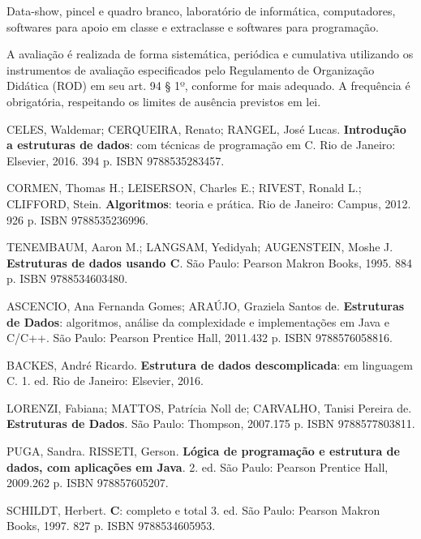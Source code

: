 \begin{pud}
	\recursos
	Data-show, pincel e quadro branco, laboratório de informática, computadores,
softwares para apoio em classe e extraclasse e softwares para programação.

	\avaliacao
	A avaliação é realizada de forma sistemática, periódica e cumulativa utilizando os
instrumentos de avaliação especificados pelo Regulamento de Organização
Didática (ROD) em seu art. 94 § 1º, conforme for mais adequado. A frequência é
obrigatória, respeitando os limites de ausência previstos em lei.
	\naopresencial
	
	
	\begin{bibbasica}
		\item CELES, Waldemar; CERQUEIRA, Renato; RANGEL, José Lucas. \textbf{Introdução a
estruturas de dados}: com técnicas de programação em C. Rio de Janeiro:
Elsevier, 2016. 394 p. ISBN 9788535283457.
		\item CORMEN, Thomas H.; LEISERSON, Charles E.; RIVEST, Ronald L.; CLIFFORD,
Stein. \textbf{Algoritmos}: teoria e prática. Rio de Janeiro: Campus, 2012. 926 p. ISBN
9788535236996.
		\item TENEMBAUM, Aaron M.; LANGSAM, Yedidyah; AUGENSTEIN, Moshe J.
\textbf{Estruturas de dados usando C}. São Paulo: Pearson Makron Books, 1995. 884 p.
ISBN 9788534603480.
	\end{bibbasica}
	
	
	\begin{bibcomplementar}
		\item ASCENCIO, Ana Fernanda Gomes; ARAÚJO, Graziela Santos de. \textbf{Estruturas de
Dados}: algoritmos, análise da complexidade e implementações em Java e C/C++.
São Paulo: Pearson Prentice Hall, 2011.432 p. ISBN 9788576058816.
		\item BACKES, André Ricardo. \textbf{Estrutura de dados descomplicada}: em linguagem C.
1. ed. Rio de Janeiro: Elsevier, 2016.
		\item LORENZI, Fabiana; MATTOS, Patrícia Noll de; CARVALHO, Tanisi Pereira de.
\textbf{Estruturas de Dados}. São Paulo: Thompson, 2007.175 p. ISBN 9788577803811.
		\item PUGA, Sandra. RISSETI, Gerson. \textbf{Lógica de programação e estrutura de
dados, com aplicações em Java}. 2. ed. São Paulo: Pearson Prentice Hall,
2009.262 p. ISBN 978857605207.
\item SCHILDT, Herbert. \textbf{C}: completo e total  3. ed. São Paulo: Pearson Makron Books,
1997. 827 p. ISBN 9788534605953.
	\end{bibcomplementar}
	
\end{pud}


